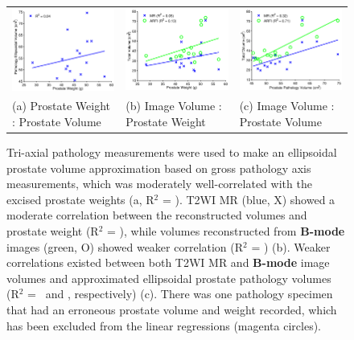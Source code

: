 \begin{figure}
\centering
\begin{small}
\begin{tabular}{lll}
\includegraphics[width=0.3\linewidth]{figs/corr_path_vol_weight_vol} &
\includegraphics[width=0.3\linewidth]{figs/corr_weight_vol} &
\includegraphics[width=0.3\linewidth]{figs/corr_pathVol_vol} \\
(a) Prostate Weight : Prostate Volume & (b) Image Volume : Prostate Weight & (c) Image Volume : Prostate Volume \\
\end{tabular}
\end{small}
\caption{Tri-axial pathology measurements were used to make an ellipsoidal
    prostate volume approximation based on gross pathology axis measurements,
    which was moderately well-correlated with the excised prostate weights (a,
    R$^2$ = \pathVolWeightRsq).  T2WI MR (blue, X) showed a moderate
    correlation between the reconstructed volumes and prostate weight (R$^2$ =
    \weightMRrsq), while volumes reconstructed from \textbf{B-mode} images
    (green, O) showed weaker correlation (R$^2$ = \weightARFIrsq) (b).  Weaker
    correlations existed between both T2WI MR and \textbf{B-mode} image volumes
    and approximated ellipsoidal prostate pathology volumes (R$^2$ =
    \pathVolMRrsq~and \pathVolARFIrsq, respectively) (c).  There was one
    pathology specimen that had an erroneous prostate volume and weight
    recorded, which has been excluded from the linear regressions (magenta
    circles).}
\label{fig:mr_arfi_weight}
\end{figure}
